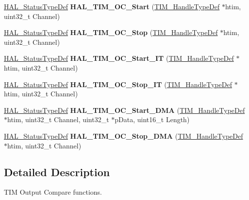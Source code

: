 \begin{DoxyCompactItemize}
\hyperlink{stm32f4xx__hal__def_8h_a63c0679d1cb8b8c684fbb0632743478f}{H\+A\+L\+\_\+\+Status\+Type\+Def} {\bfseries H\+A\+L\+\_\+\+T\+I\+M\+\_\+\+O\+C\+\_\+\+Start} (\hyperlink{struct_t_i_m___handle_type_def}{T\+I\+M\+\_\+\+Handle\+Type\+Def} $\ast$htim, uint32\+\_\+t Channel)
\item 
\mbox{\label{group___t_i_m___exported___functions___group2_ga9cb1f62afb99aea0db8cc28b378b68ad}} 
\hyperlink{stm32f4xx__hal__def_8h_a63c0679d1cb8b8c684fbb0632743478f}{H\+A\+L\+\_\+\+Status\+Type\+Def} {\bfseries H\+A\+L\+\_\+\+T\+I\+M\+\_\+\+O\+C\+\_\+\+Stop} (\hyperlink{struct_t_i_m___handle_type_def}{T\+I\+M\+\_\+\+Handle\+Type\+Def} $\ast$htim, uint32\+\_\+t Channel)
\item 
\mbox{\label{group___t_i_m___exported___functions___group2_gad3116f3b344392f7b947ff1218ba9ed8}} 
\hyperlink{stm32f4xx__hal__def_8h_a63c0679d1cb8b8c684fbb0632743478f}{H\+A\+L\+\_\+\+Status\+Type\+Def} {\bfseries H\+A\+L\+\_\+\+T\+I\+M\+\_\+\+O\+C\+\_\+\+Start\+\_\+\+IT} (\hyperlink{struct_t_i_m___handle_type_def}{T\+I\+M\+\_\+\+Handle\+Type\+Def} $\ast$htim, uint32\+\_\+t Channel)
\item 
\mbox{\label{group___t_i_m___exported___functions___group2_gacc324ef35c0b207a8331c657d86fc1bd}} 
\hyperlink{stm32f4xx__hal__def_8h_a63c0679d1cb8b8c684fbb0632743478f}{H\+A\+L\+\_\+\+Status\+Type\+Def} {\bfseries H\+A\+L\+\_\+\+T\+I\+M\+\_\+\+O\+C\+\_\+\+Stop\+\_\+\+IT} (\hyperlink{struct_t_i_m___handle_type_def}{T\+I\+M\+\_\+\+Handle\+Type\+Def} $\ast$htim, uint32\+\_\+t Channel)
\item 
\mbox{\label{group___t_i_m___exported___functions___group2_ga6f961349029a84317b7734abbfb9a02c}} 
\hyperlink{stm32f4xx__hal__def_8h_a63c0679d1cb8b8c684fbb0632743478f}{H\+A\+L\+\_\+\+Status\+Type\+Def} {\bfseries H\+A\+L\+\_\+\+T\+I\+M\+\_\+\+O\+C\+\_\+\+Start\+\_\+\+D\+MA} (\hyperlink{struct_t_i_m___handle_type_def}{T\+I\+M\+\_\+\+Handle\+Type\+Def} $\ast$htim, uint32\+\_\+t Channel, uint32\+\_\+t $\ast$p\+Data, uint16\+\_\+t Length)
\item 
\mbox{\label{group___t_i_m___exported___functions___group2_ga27f1f66d2d38ec428580a5feb3628c48}} 
\hyperlink{stm32f4xx__hal__def_8h_a63c0679d1cb8b8c684fbb0632743478f}{H\+A\+L\+\_\+\+Status\+Type\+Def} {\bfseries H\+A\+L\+\_\+\+T\+I\+M\+\_\+\+O\+C\+\_\+\+Stop\+\_\+\+D\+MA} (\hyperlink{struct_t_i_m___handle_type_def}{T\+I\+M\+\_\+\+Handle\+Type\+Def} $\ast$htim, uint32\+\_\+t Channel)
\end{DoxyCompactItemize}


\subsection{Detailed Description}
T\+IM Output Compare functions. 

